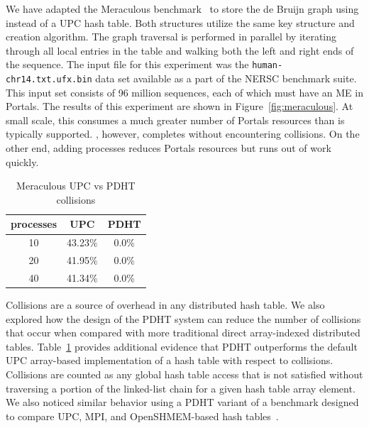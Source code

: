 We have adapted the Meraculous benchmark~\cite{georganas:14} to store the de
Bruijn graph using \pdht instead of a UPC hash table. Both structures utilize
the same key structure and creation algorithm. The graph traversal is performed
in parallel by iterating through all local entries in the table and walking
both the left and right ends of the sequence.  The input file for this
experiment was the {\tt human-chr14.txt.ufx.bin} data set available as a part
of the NERSC benchmark suite. This input set consists of 96 million sequences,
each of which must have an ME in Portals.  The results of this experiment are
shown in Figure~\ref{fig:meraculous}.  At small scale, this consumes a much
greater number of Portals resources than is typically supported. \pdht,
however, completes without encountering collisions. On the other end, adding
processes reduces Portals resources but runs out of work quickly. 

{\small
\begin{table}[h]
  \centering
  \begin{tabular}[h]{|c|c|c|}\hline
    processes & UPC & PDHT \\\hline
    10 & 43.23\% & 0.0\%\\\hline
    20 & 41.95\% & 0.0\%\\\hline
    40 & 41.34\% & 0.0\%\\\hline
  \end{tabular}
  \vspace{1mm}
  \caption{Meraculous UPC vs PDHT collisions}
  \label{tbl:collisions}
\end{table}
}
\vspace{-5mm}

Collisions are a source of overhead in any distributed hash table. We also
explored how the design of the PDHT system can reduce the number of collisions
that occur when compared with  more traditional direct array-indexed
distributed tables.  Table~\ref{tbl:collisions} provides additional evidence
that PDHT outperforms the default UPC array-based implementation of a hash
table with respect to collisions. Collisions are counted as any global hash
table access that is not satisfied without traversing a portion of the
linked-list chain for a given hash table array element. We also noticed similar
behavior using a PDHT variant of a benchmark designed to compare UPC, MPI, and
OpenSHMEM-based hash tables~\cite{maynard:12}.

    


